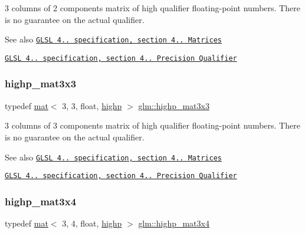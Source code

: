 3 columns of 2 components matrix of high qualifier floating-\/point numbers. There is no guarantee on the actual qualifier.

\begin{DoxySeeAlso}{See also}
\href{http://www.opengl.org/registry/doc/GLSLangSpec.4.20.8.pdf}{\tt G\+L\+SL 4.. specification, section 4.. Matrices} 

\href{http://www.opengl.org/registry/doc/GLSLangSpec.4.20.8.pdf}{\tt G\+L\+SL 4.. specification, section 4.. Precision Qualifier} 
\end{DoxySeeAlso}
\mbox{\label{group__core__precision_ga83105b0c326393a133a43c426aae2a9c}} 
\subsubsection{\texorpdfstring{highp\+\_\+mat3x3}{highp\_mat3x3}}
{\footnotesize\ttfamily typedef \mbox{\hyperlink{structglm_1_1mat}{mat}}$<$ 3, 3, float, \mbox{\hyperlink{namespaceglm_a36ed105b07c7746804d7fdc7cc90ff25ac6f7eab42eacbb10d59a58e95e362074}{highp}} $>$ \mbox{\hyperlink{group__core__precision_ga83105b0c326393a133a43c426aae2a9c}{glm\+::highp\+\_\+mat3x3}}}

3 columns of 3 components matrix of high qualifier floating-\/point numbers. There is no guarantee on the actual qualifier.

\begin{DoxySeeAlso}{See also}
\href{http://www.opengl.org/registry/doc/GLSLangSpec.4.20.8.pdf}{\tt G\+L\+SL 4.. specification, section 4.. Matrices} 

\href{http://www.opengl.org/registry/doc/GLSLangSpec.4.20.8.pdf}{\tt G\+L\+SL 4.. specification, section 4.. Precision Qualifier} 
\end{DoxySeeAlso}
\mbox{\label{group__core__precision_ga201566a8dbec6e27bec9e8e96ed4cdb6}} 
\subsubsection{\texorpdfstring{highp\+\_\+mat3x4}{highp\_mat3x4}}
{\footnotesize\ttfamily typedef \mbox{\hyperlink{structglm_1_1mat}{mat}}$<$ 3, 4, float, \mbox{\hyperlink{namespaceglm_a36ed105b07c7746804d7fdc7cc90ff25ac6f7eab42eacbb10d59a58e95e362074}{highp}} $>$ \mbox{\hyperlink{group__core__precision_ga201566a8dbec6e27bec9e8e96ed4cdb6}{glm\+::highp\+\_\+mat3x4}}}

